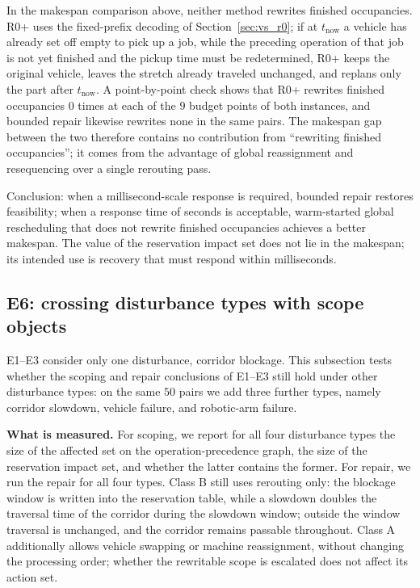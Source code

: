 \documentclass[manuscript,screen,review]{acmart}
\newcommand{\NPairs}{50}
\newcommand{\RzeroPastLo}{0}
\begin{document}
In the makespan comparison above, neither method rewrites finished occupancies. R0+ uses the fixed-prefix decoding of Section~\ref{sec:vs_r0};
if at \(t_{\mathrm{now}}\) a vehicle has already set off empty to pick up a job, while the preceding operation of that job is not yet finished and the pickup time must be redetermined,
R0+ keeps the original vehicle, leaves the stretch already traveled unchanged, and replans only the part after \(t_{\mathrm{now}}\).
A point-by-point check shows that R0+ rewrites finished occupancies \(\RzeroPastLo\) times at each of the \(9\) budget points of both instances,
and bounded repair likewise rewrites none in the same pairs. The makespan gap between the two therefore contains no contribution from ``rewriting finished occupancies'';
it comes from the advantage of global reassignment and resequencing over a single rerouting pass.

Conclusion: when a millisecond-scale response is required, bounded repair restores feasibility; when a response time of seconds is acceptable,
warm-started global rescheduling that does not rewrite finished occupancies achieves a better makespan. The value of the reservation impact set does not lie in the makespan;
its intended use is recovery that must respond within milliseconds.

\subsection{E6: crossing disturbance types with scope objects}
\label{sec:e6}

E1--E3 consider only one disturbance, corridor blockage. This subsection tests whether the scoping and repair conclusions of E1--E3 still hold under other disturbance types:
on the same \(\NPairs\) pairs we add three further types, namely corridor slowdown, vehicle failure, and robotic-arm failure.

\textbf{What is measured.} For scoping, we report for all four disturbance types the size of the affected set on the operation-precedence graph, the size of the reservation impact set, and whether the latter contains the former.
For repair, we run the repair for all four types. Class B still uses rerouting only: the blockage window is written into the reservation table, while a slowdown doubles the traversal time of the corridor during the slowdown window;
outside the window traversal is unchanged, and the corridor remains passable throughout.
Class A additionally allows vehicle swapping or machine reassignment, without changing the processing order; whether the rewritable scope is escalated does not affect its action set.
\end{document}
